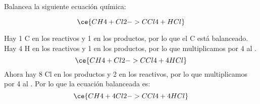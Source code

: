 Balancea la siguiente ecuación química:

\[
    \ce{CH4 + Cl2 -> CCl4 + HCl}
\]

\begin{solutionbox}{5cm}
    Hay 1 C en los reactivos y 1 en los productos, por lo que el C está balanceado.
    Hay 4 H en los reactivos y 1 en los productos, por lo que multiplicamos por 4 al .
    \[
        \ce{CH4 + Cl2 -> CCl4 + 4HCl}
    \]
    Ahora hay 8 Cl en los productos y 2 en los reactivos, por lo que multiplicamos por 4 al . Por lo que la ecuación balanceada es:
    \[
        \ce{CH4 + 4Cl2 -> CCl4 + 4HCl}
    \]
\end{solutionbox}